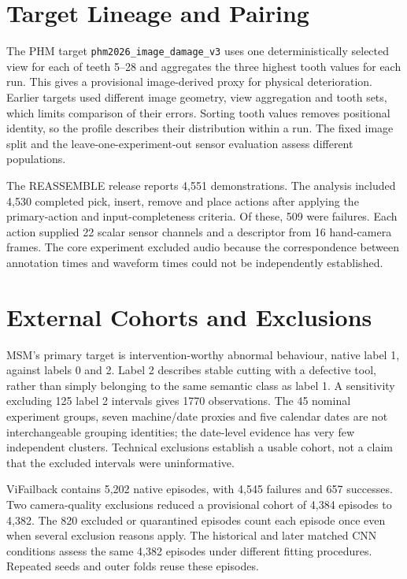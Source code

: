 \section{Target Lineage and Pairing}

The PHM target \nolinkurl{phm2026_image_damage_v3} uses one deterministically selected view for each of teeth 5--28 and aggregates the three highest tooth values for each run. This gives a provisional image-derived proxy for physical deterioration. Earlier targets used different image geometry, view aggregation and tooth sets, which limits comparison of their errors. Sorting tooth values removes positional identity, so the profile describes their distribution within a run. The fixed image split and the leave-one-experiment-out sensor evaluation assess different populations.

The REASSEMBLE release reports 4,551 demonstrations. The analysis included 4,530 completed pick, insert, remove and place actions after applying the primary-action and input-completeness criteria. Of these, 509 were failures. Each action supplied 22 scalar sensor channels and a descriptor from 16 hand-camera frames. The core experiment excluded audio because the correspondence between annotation times and waveform times could not be independently established.

\section{External Cohorts and Exclusions}

MSM's primary target is intervention-worthy abnormal behaviour, native label 1, against labels 0 and 2. Label 2 describes stable cutting with a defective tool, rather than simply belonging to the same semantic class as label 1. A sensitivity excluding 125 label 2 intervals gives 1770 observations. The 45 nominal experiment groups, seven machine/date proxies and five calendar dates are not interchangeable grouping identities; the date-level evidence has very few independent clusters. Technical exclusions establish a usable cohort, not a claim that the excluded intervals were uninformative.

ViFailback contains 5,202 native episodes, with 4,545 failures and 657 successes. Two camera-quality exclusions reduced a provisional cohort of 4,384 episodes to 4,382. The 820 excluded or quarantined episodes count each episode once even when several exclusion reasons apply. The historical and later matched CNN conditions assess the same 4,382 episodes under different fitting procedures. Repeated seeds and outer folds reuse these episodes.

